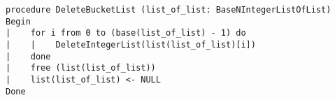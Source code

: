 \begin{lstlisting}[breaklines]
procedure DeleteBucketList (list_of_list: BaseNIntegerListOfList)
Begin
|    for i from 0 to (base(list_of_list) - 1) do
|    |    DeleteIntegerList(list(list_of_list)[i])
|    done
|    free (list(list_of_list))
|    list(list_of_list) <- NULL
Done
\end{lstlisting}
